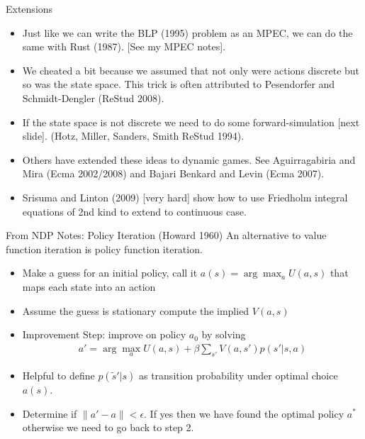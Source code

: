 \documentclass[xcolor=pdftex,dvipsnames,table,mathserif]{beamer}
\begin{document}
\begin{frame}{Extensions}
\begin{itemize}
\item Just like we can write the BLP (1995) problem as an \alert{MPEC}, we can do the same with Rust (1987). [See my MPEC notes].
\item We cheated a bit because we assumed that not only were actions discrete but so was the state space. This trick is often attributed to Pesendorfer and Schmidt-Dengler (ReStud 2008).
\item If the state space is not discrete we need to do some forward-simulation [next slide]. (Hotz, Miller, Sanders, Smith ReStud 1994).
\item Others have extended these ideas to \alert{dynamic games}. See Aguirragabiria and Mira (Ecma 2002/2008) and Bajari Benkard and Levin (Ecma 2007).
\item Srisuma and Linton (2009) [very hard] show how to use Friedholm integral equations of 2nd kind to extend to continuous case.
\end{itemize}
\end{frame}


\begin{frame}{From NDP Notes: Policy Iteration (Howard 1960)}
An alternative to value function iteration is policy function iteration. 
\begin{itemize}
\item Make a guess for an initial policy, call it $a(s) = \arg \max_a U(a,s)$ that maps each state into an action
\item Assume the guess is stationary compute the implied $V(a,s)$
\item Improvement Step: improve on policy $a_0$ by solving 
\begin{eqnarray*}
a' = \arg \max_a U(a,s) + \beta \sum_{s'} V(a,s') p(s' | s,a)
\end{eqnarray*}
\item Helpful to define $p(\tilde{s}' | s)$ as transition probability under optimal choice $a(s)$.
\item Determine if $\| a' -a\| < \epsilon$. If yes then we have found the optimal policy $a^* $ otherwise we need to go back to step 2.
\end{itemize}
\end{frame}
\end{document}
